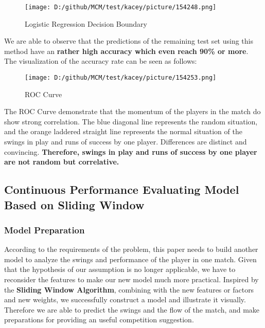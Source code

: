 \documentclass{mcmthesis}
\begin{document}
\begin{figure}[H]
    \centering
    \texttt{[image: D:/github/MCM/test/kacey/picture/154248.png]}
    \caption{Logistic Regression Decision Boundary} \label{Figure 14}
\end{figure}

We are able to observe that the predictions of the remaining test set using this method have an
{\bf rather high accuracy which even reach 90\% or more}. \\
The visualization of the accuracy rate can be seen as follows:

\begin{figure}[htbp]
    \centering
    \texttt{[image: D:/github/MCM/test/kacey/picture/154253.png]}
    \caption{ROC Curve} \label{Figure 15}
\end{figure}

The ROC Curve demonstrate that the momentum of the players in the match do show strong
correlation. The blue diagonal line represents the random situation, and the orange laddered
straight line represents the normal situation of the swings in play and runs of success by one player. Differences are distinct and convincing. {\bf Therefore, swings in play and runs of success by one
player are not random but correlative.}

\subsection{Continuous Performance Evaluating Model Based on Sliding Window}

\subsubsection{Model Preparation}
According to the requirements of the problem, this paper needs to build another model to
analyze the swings and performance of the player in one match. Given that the hypothesis of our
assumption is no longer applicable, we have to reconsider the features to make our new model
much more practical. Inspired by the {\bf Sliding Window Algorithm}, combining with the new
features or factors and new weights, we successfully construct a model and illustrate it visually. Therefore we are able to predict the swings and the flow of the match, and make preparations for
providing an useful competition suggestion.
\end{document}

